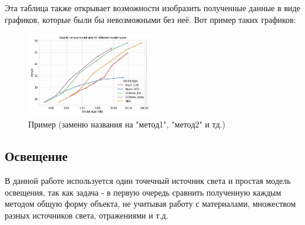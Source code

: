 \documentclass[a4paper,hidelinks,12pt]{article}
\begin{document}
\begin{table}[h]
	\centering
	\caption{Экспрементально подобранные параметры для каждого заданного размера.}
\end{table}

\newpage 
Эта таблица также открывает возможности изобразить полученные данные в виде графиков, которые были бы невозможными без неё. Вот пример таких графиков:

\begin{figure}[ht]
  \centering
  \includegraphics[width=0.5\textwidth]{example.jpg}
  \caption{Пример (заменю названия на "метод1", "метод2" и тд.)}
  \label{fig:example}
\end{figure}

\subsection{Освещение}
В данной работе используется один точечный источник света и простая модель освещения, так как задача - в первую очередь сравнить полученную каждым методом общую форму
объекта, не учитывая работу с материалами, множеством разных источников света, отражениями и т.д.
\end{document}
